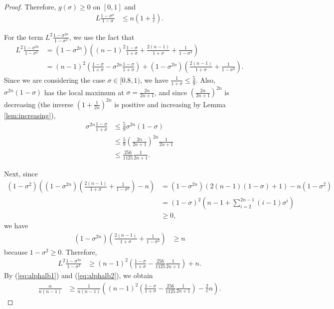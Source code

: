 \documentclass{article}
\theoremstyle{plain}
\theoremstyle{definition}
\theoremstyle{remark}
\def\bigopen#1{\left(#1\right)}
\begin{document}
\begin{proof}
Therefore, $g(\sigma)\ge 0$ on $[0, 1]$ and 
\begin{align}
    \label{eq:alphalb1}
    L \frac{1-\sigma^n}{1-\sigma} &\le n \bigopen{1+\frac{1}{e}}.
\end{align}

For the term $L^2 \frac{1-\sigma^{2n}}{1-\sigma^2}$, we use the fact that 
\begin{align*}
    L^2 \frac{1-\sigma^{2n}}{1-\sigma^2} &= (1-\sigma^{2n})\bigopen{ (n-1)^2 \frac{1-\sigma}{1+\sigma} + \frac{2(n-1)}{1+\sigma} + \frac{1}{1-\sigma^2} } \\
    &= (n-1)^2 \bigopen{\frac{1-\sigma}{1+\sigma} - \sigma^{2n} \frac{1-\sigma}{1+\sigma}} + (1-\sigma^{2n}) \bigopen{ \frac{2(n-1)}{1+\sigma} + \frac{1}{1-\sigma^2} }.
\end{align*}
Since we are considering the case $\sigma\in [0.8, 1)$, we have $\frac{1}{1+\sigma} \le \frac{5}{9}$. Also, $\sigma^{2n}(1-\sigma)$ has the local maximum at $\sigma=\frac{2n}{2n+1}$, and since $\bigopen{ \frac{2n}{2n+1} }^{2n}$ is decreasing (the inverse $\bigopen{1+\frac{1}{2n}}^{2n}$ is positive and increasing by Lemma \ref{lem:increasing}), 
\begin{align*}
    \sigma^{2n} \frac{1-\sigma}{1+\sigma} &\le \frac{5}{9} \sigma^{2n} (1-\sigma) \\
    &\le \frac{5}{9}\bigopen{ \frac{2n}{2n+1} }^{2n} \frac{1}{2n+1}\\
    &\le \frac{256}{1125} \frac{1}{2n+1}.
\end{align*}

Next, since 
\begin{align*}
    (1-\sigma^2) \bigopen{(1-\sigma^{2n}) \bigopen{ \frac{2(n-1)}{1+\sigma} + \frac{1}{1-\sigma^2} } - n} &= (1-\sigma^{2n}) (2(n-1)(1-\sigma)+1) - n(1-\sigma^2) \\
    &= (1-\sigma)^2 \bigopen{n-1+\sum_{i=2}^{2n-1}(i-1)\sigma^i} \\
    &\ge 0,
\end{align*}
we have
\begin{align*}
    (1-\sigma^{2n}) \bigopen{ \frac{2(n-1)}{1+\sigma} + \frac{1}{1-\sigma^2} } &\ge n
\end{align*}
because $1-\sigma^2 \ge 0$.
Therefore, 
\begin{align}
    \label{eq:alphalb2}
    L^2 \frac{1-\sigma^{2n}}{1-\sigma^2} &\ge (n-1)^2 \bigopen{\frac{1-\sigma}{1+\sigma}-\frac{256}{1125} \frac{1}{2n+1}} + n.
\end{align}
By (\ref{eq:alphalb1}) and (\ref{eq:alphalb2}), we obtain 
\begin{align}
    \frac{\alpha}{n(n-1)} &\ge \frac{1}{n(n-1)} \bigopen{ (n-1)^2 \bigopen{\frac{1-\sigma}{1+\sigma}-\frac{256}{1125} \frac{1}{2n+1}} - \frac{2}{e}n}. \label{eq:alphalb}
\end{align}


\end{proof}
\end{document}
